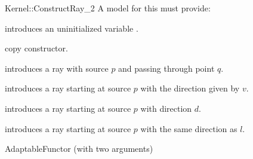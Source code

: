 \begin{ccRefFunctionObjectConcept}{Kernel::ConstructRay_2}
A model for this must provide:



\ccHidden {}
             {introduces an uninitialized variable .}

\ccHidden {}
            {copy constructor.}

            {introduces a ray  
             with source $p$ and passing through point $q$.}

            {introduces a ray starting at source $p$ with 
             the direction given by $v$.}

            {introduces a ray  starting at source $p$ with 
             direction $d$.}

            {introduces a ray  starting at source $p$ with 
             the same direction as $l$.}

\ccRefines
AdaptableFunctor (with two arguments)

\ccSeeAlso
{}\\

\end{ccRefFunctionObjectConcept}
